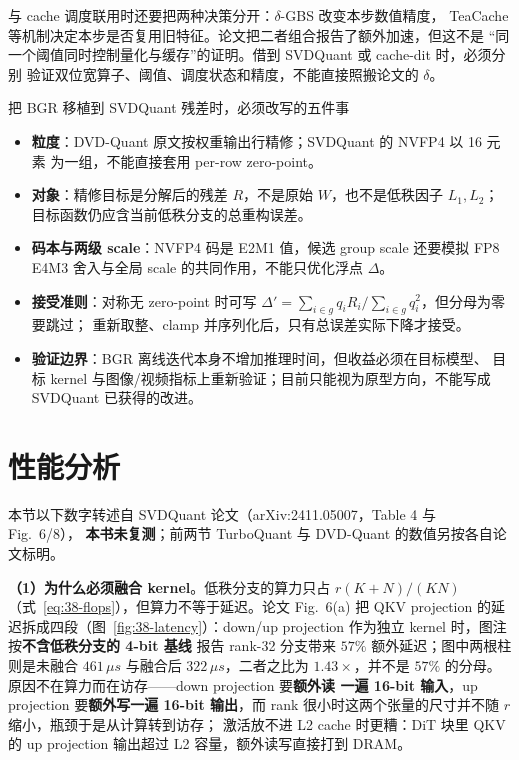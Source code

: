 与 cache 调度联用时还要把两种决策分开：$\delta$-GBS 改变本步数值精度，
TeaCache 等机制决定本步是否复用旧特征。论文把二者组合报告了额外加速，但这不是
“同一个阈值同时控制量化与缓存”的证明。借到 SVDQuant 或 cache-dit 时，必须分别
验证双位宽算子、阈值、调度状态和精度，不能直接照搬论文的 $\delta$。

\begin{kaogu}[F3/F4]{把 BGR 移植到 SVDQuant 残差时，必须改写的五件事}
\begin{itemize}[itemsep=0.5pt,topsep=1pt]
  \item \textbf{粒度}：DVD-Quant 原文按权重输出行精修；SVDQuant 的 NVFP4 以 16 元素
        为一组，不能直接套用 per-row zero-point。
  \item \textbf{对象}：精修目标是分解后的残差 $R$，不是原始 $W$，也不是低秩因子
        $L_1,L_2$；目标函数仍应含当前低秩分支的总重构误差。
  \item \textbf{码本与两级 scale}：NVFP4 码是 E2M1 值，候选 group scale 还要模拟
        FP8 E4M3 舍入与全局 scale 的共同作用，不能只优化浮点 $\Delta$。
  \item \textbf{接受准则}：对称无 zero-point 时可写
        $\Delta'=\sum_{i\in g}q_iR_i/\sum_{i\in g}q_i^2$，但分母为零要跳过；
        重新取整、clamp 并序列化后，只有总误差实际下降才接受。
  \item \textbf{验证边界}：BGR 离线迭代本身不增加推理时间，但收益必须在目标模型、
        目标 kernel 与图像/视频指标上重新验证；目前只能视为原型方向，不能写成
        SVDQuant 已获得的改进。
\end{itemize}
\end{kaogu}

\section{性能分析}

本节以下数字转述自 SVDQuant 论文（arXiv:2411.05007，Table 4 与 Fig.~6/8），
\textbf{本书未复测}；前两节 TurboQuant 与 DVD-Quant 的数值另按各自论文标明。

\textbf{（1）为什么必须融合 kernel}。低秩分支的算力只占
$r(K+N)/(KN)$（式~\ref{eq:38-flops}），但算力不等于延迟。论文 Fig.~6(a)
把 QKV projection 的延迟拆成四段（图~\ref{fig:38-latency}）：down/up
projection 作为独立 kernel 时，图注按\textbf{不含低秩分支的 4-bit 基线}
报告 rank-32 分支带来 $57\%$ 额外延迟；图中两根柱则是未融合
$461\,\mu s$ 与融合后 $322\,\mu s$，二者之比为 $1.43\times$，并不是
$57\%$ 的分母。原因不在算力而在访存——down projection 要\textbf{额外读
一遍 16-bit 输入}，up projection 要\textbf{额外写一遍 16-bit 输出}，而
rank 很小时这两个张量的尺寸并不随 $r$ 缩小，瓶颈于是从计算转到访存；
激活放不进 L2 cache 时更糟：DiT 块里 QKV 的 up projection 输出超过
L2 容量，额外读写直接打到 DRAM。

